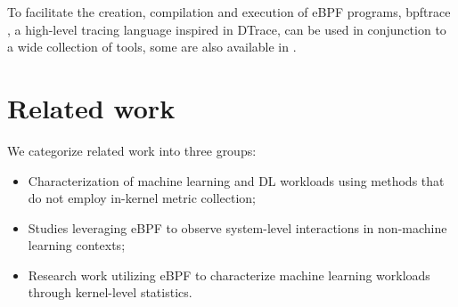 \documentclass[conference]{IEEEtran}
\begin{document}
    To facilitate the creation, compilation and execution of eBPF programs, bpftrace \cite{bpftrace}, a high-level tracing language inspired in DTrace, can be used in conjunction to a wide collection of tools, some are also available in \cite{bgreggBook}.

\section{Related work}

We categorize related work into three groups: 
\begin{itemize}
    \item Characterization of machine learning and DL workloads using methods that do not employ in-kernel metric collection;
    \item Studies leveraging eBPF to observe system-level interactions in non-machine learning contexts;
    \item Research work utilizing eBPF to characterize machine learning workloads through kernel-level statistics. 
\end{itemize}
\end{document}
